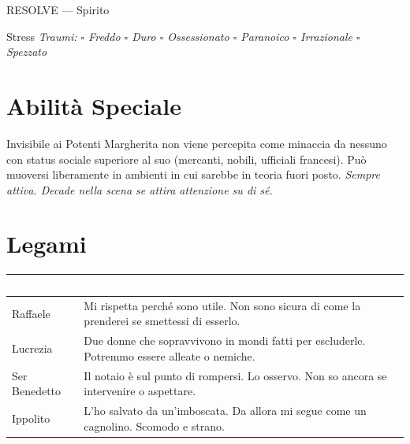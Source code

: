 \begin{attributoblock}[SpinolaRed]{RESOLVE — Spirito}


\end{attributoblock}

\medskip
\begin{pgclockbox}{Stress \hfill {}}
\small\textit{Traumi: $\square$ Freddo \quad $\square$ Duro \quad $\square$ Ossessionato \quad $\square$ Paranoico \quad $\square$ Irrazionale \quad $\square$ Spezzato}
\end{pgclockbox}

\section*{Abilità Speciale}
\begin{spinolabox}{Invisibile ai Potenti}
Margherita non viene percepita come minaccia da nessuno con status sociale superiore al suo (mercanti, nobili, ufficiali francesi). Può muoversi liberamente in ambienti in cui sarebbe in teoria fuori posto. \textit{Sempre attiva. Decade nella scena se attira attenzione su di sé.}
\end{spinolabox}

\section*{Legami}
\begin{table}[h]\centering\renewcommand{\arraystretch}{1.4}
\begin{tabularx}{\linewidth}{@{}L{2.6cm} X@{}}
\toprule{}
\textcolor{white}{\textbf{PG}} & \textcolor{white}{\textbf{Legame}} \\
\midrule
Raffaele & Mi rispetta perché sono utile. Non sono sicura di come la prenderei se smettessi di esserlo. \\
Lucrezia & Due donne che sopravvivono in mondi fatti per escluderle. Potremmo essere alleate o nemiche. \\
Ser Benedetto & Il notaio è sul punto di rompersi. Lo osservo. Non so ancora se intervenire o aspettare. \\
Ippolito & L'ho salvato da un'imboscata. Da allora mi segue come un cagnolino. Scomodo e strano. \\
\bottomrule
\end{tabularx}
\end{table}

